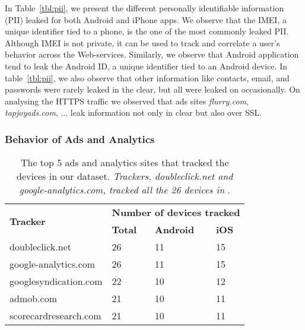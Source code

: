 In Table~\ref{tbl:pii}, we present the different personally identifiable information (PII) leaked for both Android and iPhone apps.  
We observe that the IMEI, a unique identifier tied to a phone, is the one of the most commonly leaked PII.
Although IMEI is not private, it can be used to track and correlate a user's behavior across the Web-services.
Similarly, we observe that Android application tend to leak the Android ID, a unique identifier tied to an Android device.
In table~\ref{tbl:pii}, we also observe that other information like contacts, email, and passwords were rarely leaked in the clear, but all were leaked on occasionally.
On analysing the HTTPS traffic we observed that ads sites \emph{flurry.com}, \emph{tapjoyads.com}, ... leak information not only in clear but also over SSL. 

\subsubsection{Behavior of Ads and Analytics}

\begin{table}[t]
\centering
\begin{small}
\begin{tabular}{|p{}|p{}|p{}|p{}|}
\hline
\multirow{2}{*}{\bf Tracker} & \multicolumn{3}{c|}{\bf Number of devices tracked}\tabularnewline
\cline{2-4}
   &  {\bf Total} & {\bf Android} & {\bf iOS} \tabularnewline
\hline
doubleclick.net & 26 & 11 & 15 \tabularnewline
\hline
google-analytics.com   & 26 & 11 & 15 \tabularnewline
\hline
googlesyndication.com  & 22 & 10 & 12 \tabularnewline
\hline
admob.com  & 21 & 10 & 11 \tabularnewline
\hline
scorecardresearch.com &  21 & 10 & 11 \tabularnewline
\hline
\end{tabular}
\end{small}
\caption{The top 5 ads and analytics sites that tracked the devices in our dataset.
\emph{Trackers, doubleclick.net and google-analytics.com, tracked all the 26 devices in} \mobWild.}
\label{tab:top_trackers}
\end{table}


